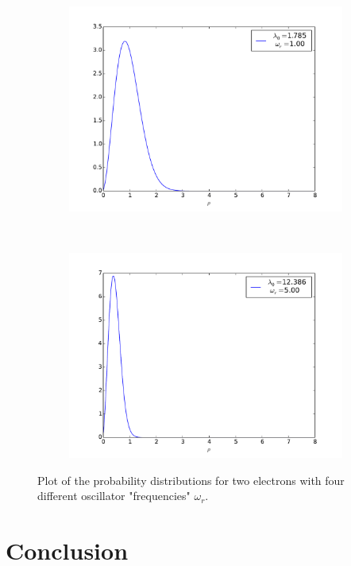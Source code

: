 \documentclass[11pt, a4paper]{article}
\begin{document}
\begin{figure}
\begin{subfigure}[b]{0.45\textwidth}
				\end{subfigure}
				\begin{subfigure}[b]{0.45\textwidth}
					\includegraphics[width=1.1\textwidth]{plot-twoElectrons_1}
				\end{subfigure}
				~ %
				\begin{subfigure}[b]{0.45\textwidth}
					\includegraphics[width=1.1\textwidth]{plot-twoElectrons_5}
				\end{subfigure}
				\caption{Plot of the probability distributions for two electrons with four different oscillator "frequencies" $\omega_r$. }\label{fig: plot two electrons}
\end{figure}
		
	\section{Conclusion}

		
	
		
	
\end{document}
